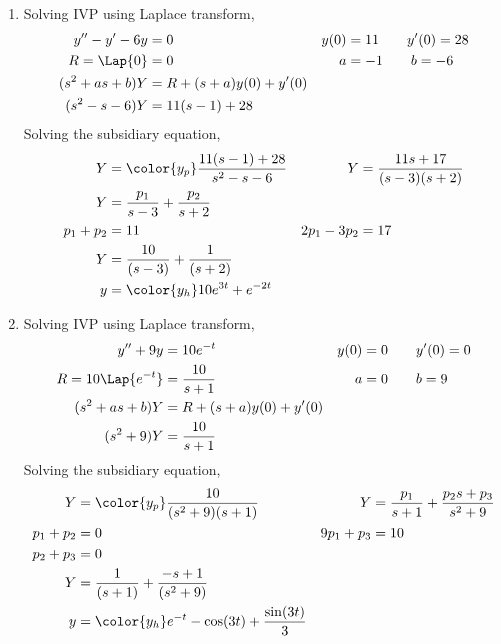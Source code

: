 \begin{enumerate}
    \item Solving IVP using Laplace transform,
          \begin{align}
              y'' - y' - 6y   & = 0                     &
              y(0)            & = 11 \qquad y'(0) = 28    \\
              R = \Lap\{0\}   & = 0                     &
              a               & = -1 \qquad b = -6        \\
              (s^2 + as + b)Y & = R + (s+a)y(0) + y'(0)   \\
              (s^2 - s - 6)Y  & = 11(s-1) + 28
          \end{align}
          Solving the subsidiary equation,
          \begin{align}
              Y           & = \color{y_p}\frac{11(s-1) + 28}{s^2 - s - 6} &
              Y           & = \frac{11s + 17}{(s-3)(s+2)}                   \\
              Y           & = \frac{p_1}{s-3} + \frac{p_2}{s+2}             \\
              p_1 + p_2   & = 11                                          &
              2p_1 - 3p_2 & = 17                                            \\
              Y           & = \frac{10}{(s-3)} + \frac{1}{(s+2)}            \\
              y           & = \color{y_h} 10e^{3t} + e^{-2t}
          \end{align}

    \item Solving IVP using Laplace transform,
          \begin{align}
              y'' + 9y             & = 10e^{-t}              &
              y(0)                 & = 0 \qquad y'(0) = 0      \\
              R = 10\Lap\{e^{-t}\} & = \frac{10}{s+1}        &
              a                    & = 0 \qquad b = 9          \\
              (s^2 + as + b)Y      & = R + (s+a)y(0) + y'(0)   \\
              (s^2 + 9)Y           & = \frac{10}{s+1}
          \end{align}
          Solving the subsidiary equation,
          \begin{align}
              Y          & = \color{y_p}\frac{10}{(s^2+9)(s+1)}                  &
              Y          & = \frac{p_1}{s+1} + \frac{p_2s + p_3}{s^2+9}            \\
              p_1 + p_2  & = 0                                                   &
              9p_1 + p_3 & = 10                                                    \\
              p_2 + p_3  & = 0                                                     \\
              Y          & = \frac{1}{(s+1)} + \frac{-s+1}{(s^2+9)}                \\
              y          & = \color{y_h} e^{-t}  - \cos(3t) + \frac{\sin(3t)}{3}
          \end{align}


\end{enumerate}
